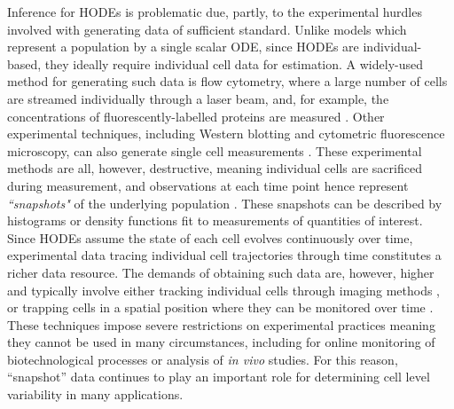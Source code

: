 Inference for HODEs is problematic due, partly, to the experimental hurdles involved with generating data of sufficient standard. Unlike models which represent a population by a single scalar ODE, since HODEs are individual-based, they ideally require individual cell data for estimation. A widely-used method for generating such data is flow cytometry, where a large number of cells are streamed individually through a laser beam, and, for example, the concentrations of fluorescently-labelled proteins are measured \cite{telford2012flow}. Other experimental techniques, including Western blotting and cytometric fluorescence microscopy, can also generate single cell measurements \cite{hughes2014single,hasenauer2011identification}. These experimental methods are all, however, destructive, meaning individual cells are sacrificed during measurement, and observations at each time point hence represent \emph{``snapshots"} of the underlying population \cite{hasenauer2011identification}. These snapshots can be described by histograms \cite{dixit2018maximum} or density functions \cite{waldherr2018estimation} fit to measurements of quantities of interest. Since HODEs assume the state of each cell evolves continuously over time, experimental data tracing individual cell trajectories through time constitutes a richer data resource. The demands of obtaining such data are, however, higher and typically involve either tracking individual cells through imaging methods \cite{hilsenbeck2016software}, or trapping cells in a spatial position where they can be monitored over time \cite{fritzsch2012single}. These techniques impose severe restrictions on experimental practices meaning they cannot be used in many circumstances, including for online monitoring of biotechnological processes or analysis of \textit{in vivo} studies. For this reason, ``snapshot'' data continues to play an important role for determining cell level variability in many applications.

